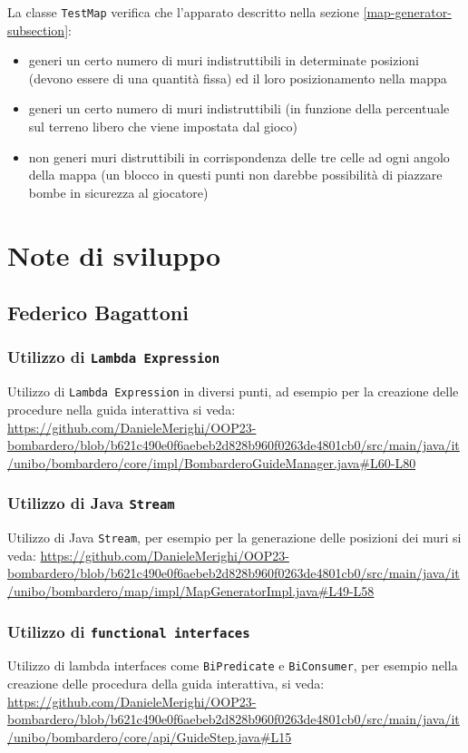 \documentclass[a4paper,12pt]{report}
\begin{document}
\par
La classe \texttt{TestMap} verifica che l'apparato descritto nella sezione \ref{map-generator-subsection}:
\begin{itemize}
    \item{generi un certo numero di muri indistruttibili in determinate posizioni (devono essere di una quantità fissa) ed il loro posizionamento nella mappa}
    \item{generi un certo numero di muri indistruttibili (in funzione della percentuale sul terreno libero che viene impostata dal gioco)}
    \item{non generi muri distruttibili in corrispondenza delle tre celle ad ogni angolo della mappa (un blocco in questi punti non darebbe possibilità di piazzare bombe in sicurezza al giocatore)}
\end{itemize}

\section{Note di sviluppo}

\subsection{Federico Bagattoni}
\subsubsection{Utilizzo di \texttt{Lambda Expression}}
Utilizzo di \texttt{Lambda Expression} in diversi punti, ad esempio per la creazione
delle procedure nella guida interattiva si veda: \url{https://github.com/DanieleMerighi/OOP23-bombardero/blob/b621c490e0f6aebeb2d828b960f0263de4801cb0/src/main/java/it/unibo/bombardero/core/impl/BombarderoGuideManager.java#L60-L80}

\subsubsection{Utilizzo di Java \texttt{Stream}}
Utilizzo di Java \texttt{Stream}, per esempio per la generazione delle posizioni dei muri si veda:
\url{https://github.com/DanieleMerighi/OOP23-bombardero/blob/b621c490e0f6aebeb2d828b960f0263de4801cb0/src/main/java/it/unibo/bombardero/map/impl/MapGeneratorImpl.java#L49-L58} 

\subsubsection{Utilizzo di \texttt{functional interfaces}}
Utilizzo di lambda interfaces come \texttt{BiPredicate} e \texttt{BiConsumer}, per esempio nella creazione delle procedura della guida interattiva, si veda:
\url{https://github.com/DanieleMerighi/OOP23-bombardero/blob/b621c490e0f6aebeb2d828b960f0263de4801cb0/src/main/java/it/unibo/bombardero/core/api/GuideStep.java#L15}
\end{document}
